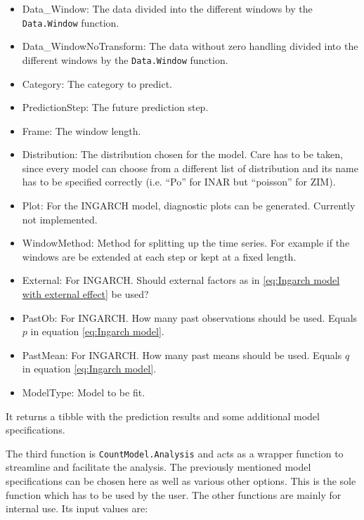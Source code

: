 \begin{itemize}
	\item Data\_Window: The data divided into the different windows by the \texttt{Data.Window} function.
	\item Data\_WindowNoTransform: The data without zero handling divided into the different windows by the \texttt{Data.Window} function.
  \item Category: The category to predict. 
  \item PredictionStep: The future prediction step.
  \item Frame: The window length.
  \item Distribution: The distribution chosen for the model. Care has to be taken, since every model can choose from a different list of distribution and its name has to be specified correctly (i.e. "`Po"' for INAR but "`poisson"' for ZIM). 
  \item Plot: For the INGARCH model, diagnostic plots can be generated. Currently not implemented.
  \item WindowMethod: Method for splitting up the time series. For example if the windows are be extended at each step or kept at a fixed length.
  \item External: For INGARCH. Should external factors as in \ref{eq:Ingarch model with external effect} be used?
  \item PastOb: For INGARCH. How many past observations should be used. Equals $p$ in equation \ref{eq:Ingarch model}.
  \item PastMean: For INGARCH. How many past means should be used. Equals $q$ in equation \ref{eq:Ingarch model}.
  \item ModelType: Model to be fit. 
\end{itemize}

It returns a tibble with the prediction results and some additional model specifications. 

The third function is \texttt{CountModel.Analysis} and acts as a wrapper function to streamline and facilitate the analysis. The previously mentioned model specifications can be chosen here as well as various other options. This is the sole function which has to be used by the user. The other functions are mainly for internal use. Its input values are:

